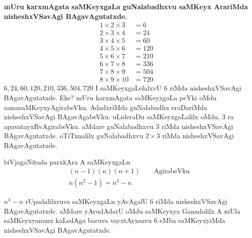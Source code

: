 \smallskip
{\bf mUru karxmAgata saMKeyxgaLa guNalabadhxvu saMKeyx ArariMda nisheshxVSavAgi BAga\-vAgutatxde.}
\begin{align*}
1\times 2 \times 3 &=6 \\
2\times 3 \times 4 &=24 \\
3\times 4 \times 5 &=60 \\
4\times 5 \times 6 &=120 \\
5\times 6 \times 7 &= 210\\
6\times 7 \times 8 &=336 \\
7\times 8 \times 9 &=504 \\
8\times 9 \times 10&= 720
\end{align*}
$6,24,60,120,210,336,504,720$ I saMKeyxgaLelalxvU $6$ riMda nisheshxVSavAgi BAga\-vAgutatxde. Eke? mUru karxmAgata saMKeyxgaLa peYki oMdu samasaMKeyxyAgirabeVku. AdadxriMda guNalabadhx eraDariMda nisheshxVSavAgi BAgavAgabeVku. uLideraDu saMKeyxgaLalilx oMdu, $3$ ra apavatayxRvAgirabeVku. aMdare guNalabadhxvu $3$ riMda nisheshxVSavAgi BAgavAgutatxde. oTiTxnalilx guNalabadhxvu $2\times 3$ riMda nisheshxVSavAgi BAgavAgutatxde.

biVjagaNitada parxkAra A saMKeyxgaLu
\begin{align*}
&(n-1)(n)(n+1)\qquad \text{AgirabeVku}\\
&n(n^2-1)=n^3-n
\end{align*}

$n^3-n$ rUpadalilxruva saMKeyxgaLu yAvAgalU $6$ riMda nisheshxVSavAgi BAga\-vAgutatxde. aMdare yAvudAdarU oMdu saMKeyxya Ganadalilx A mUla saMKeyxyanunx kaLedAga baruva vayxtAyxsavu $6$ eMba saMKeyxyiMda nisheshxVSavAgi BAgavAgutatxde.
